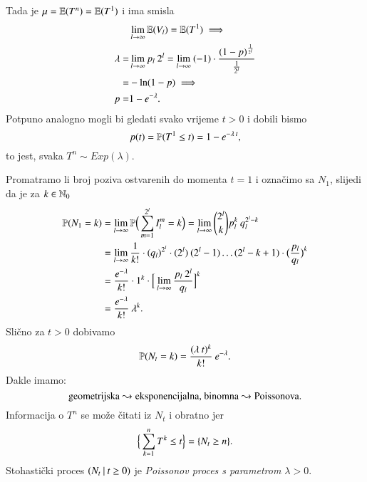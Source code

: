 \begin{pr}
    Tada je $\mu = \mathbb{E} (T^n) = \mathbb{E} (T^1)$ i ima smisla
    \begin{equation*}
        \begin{aligned}
            & \lim\limits_{l \to \infty} \mathbb{E} (V_l) = \mathbb{E} (T^1) \implies \\
            \lambda = & \lim\limits_{l \to \infty} p_l \: 2^l = \lim\limits_{l \to \infty} \: (-1) \cdot \frac{(1-p)^{\frac{1}{2^l}}}{\frac{1}{2^l}}\\
            = & - \ln (1 - p) \implies\\
            p =& 1 - e^{-\lambda}.
        \end{aligned}
    \end{equation*}
    Potpuno analogno mogli bi gledati svako vrijeme $t>0$ i dobili bismo
    \begin{equation*}
        p(t) = \mathbb{P}({T^1 \leq t}) = 1 - e^{- \lambda \: t},
    \end{equation*}
    to jest, svaka $T^n \sim Exp(\lambda)$.

    Promatramo li broj poziva ostvarenih do momenta $t = 1$ i ozna\v cimo sa $N_1$, slijedi da je za $k \in \mathbb{N}_0$
    \begin{equation*}
        \begin{aligned}
            \mathbb{P}({N_1 = k}) &= \lim\limits_{l \to \infty} \mathbb{P} \Big(\sum\limits_{m = 1}^{2^l} I_l^m = k \Big) = \lim\limits_{l \to \infty} {2^l \choose k} p_l^k \: q_l^{2^l - k}\\
            &= \lim\limits_{l \to \infty} \frac{1}{k!} \cdot (q_l)^{2^l} \cdot (2^l) \: (2^l - 1) \ldots (2^l - k + 1) \cdot \big( \frac{p_l}{q_l} \big)^k\\
            &= \frac{e^{-\lambda}}{k!} \cdot 1^k \cdot \Big[ \lim\limits_{l \to \infty} \frac{p_l \: 2^l}{q_l} \Big]^k\\
            &= \frac{e^{-\lambda}}{k!} \: \lambda^k.
        \end{aligned}
    \end{equation*}
    Sli\v cno za $t > 0$ dobivamo
    \begin{equation*}
        \mathbb{P}({N_t = k}) = \frac{(\lambda \: t)^k}{k!} \: e^{-\lambda}.
    \end{equation*}
    Dakle imamo:
    \begin{equation*}
        \textnormal{geometrijska} \leadsto \textnormal{eksponencijalna, binomna} \leadsto \textnormal{Poissonova}.
    \end{equation*}
    Informacija o $T^n$ se mo\v ze \v citati iz $N_t$ i obratno jer 
    \begin{equation*}
        \Big\{ \sum\limits_{k = 1}^{n} T^k \leq t \Big\} = \{ N_t \geq n \}.
    \end{equation*}
    Stohasti\v cki proces $({N_t} \: | \: {t \geq 0})$ je \emph{Poissonov proces s parametrom $\lambda > 0$}.
\end{pr}

